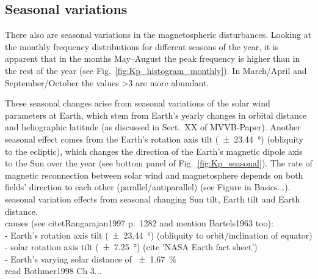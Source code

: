 \subsection{Seasonal \Kp{} variations}
There also are seasonal variations in the magnetospheric disturbances. Looking at the monthly \Kp{} frequency distributions for different seasons of the year, it is apparent that in the months May--August the \Kp{} peak frequency is higher than in the rest of the year (see Fig.~\ref{fig:Kp_histogram_monthly}). In March/April and September/October the \Kp{} values \num{>3} are more abundant.\\
\begin{figure}
\end{figure}
These seasonal \Kp{} changes arise from seasonal variations of the solar wind parameters at Earth, which stem from Earth's yearly changes in orbital distance and heliographic latitude (as discussed in Sect.~XX of MVVB-Paper). Another seasonal effect comes from the Earth's rotation axis tilt (\SI{+-23.44}{\degree}) (obliquity to the ecliptic), which changes the direction of the Earth's magnetic dipole axis to the Sun over the year (see bottom panel of Fig.~\ref{fig:Kp_seasonal}). The rate of magnetic reconnection between solar wind and magnetosphere depends on both fields' direction to each other (parallel/antiparallel) (see Figure in Basics...).\\

\Kp{} seasonal variation effects from seasonal changing Sun tilt, Earth tilt and Earth distance.\\
causes (see citet{Rangarajan1997} p.~1282 and mention Bartels1963 too):\\
- Earth's rotation axis tilt (\SI{+-23.44}{\degree}) (obliquity to orbit/inclination of equator)\\
- solar rotation axis tilt (\SI{+-7.25}{\degree}) (cite 'NASA Earth fact sheet')\\
- Earth's varying solar distance of \SI{+-1.67}{\percent}\\
read Bothmer1998 Ch 3...\\



